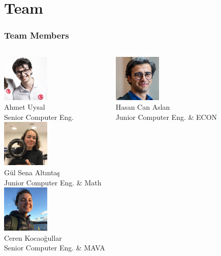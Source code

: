   \section{Team}
    \begin{frame}
      \frametitle{Team Members}
      \begin{columns}
				\column{5cm}
				\centering 
					\includegraphics[width=2.25cm]{images/ahmet.jpg}\\
					Ahmet Uysal\\
					Senior Computer Eng.\\

          \includegraphics[width=2.25cm]{images/gulsena.jpg}\\
					Gül Sena Altıntaş\\
					Junior Computer Eng. \& Math\\
				\column{5cm}
				\centering
					\includegraphics[width=2.25cm]{images/ceren.jpg}\\
					Ceren Kocaoğullar\\
					Senior Computer Eng. \& MAVA
          
          \includegraphics[width=2.25cm]{images/hasancan.jpg}\\
					Hasan Can Aslan\\
					Junior Computer Eng. \& ECON
			\end{columns}
    
    \end{frame}


